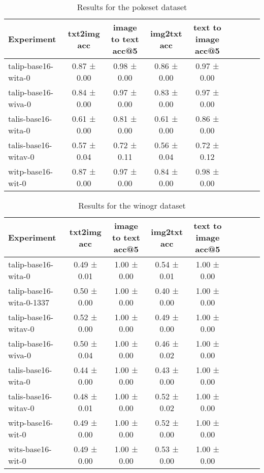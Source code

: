 \begin{table}[htbp]
\caption{Results for the pokeset dataset}
\begin{tabular}{|l|c|c|c|c|c|c|c|c|}\hline
Experiment & txt2img acc & image to text acc@5 & img2txt acc & text to image acc@5\\
\hline
talip-base16-wita-0 & 0.87 ± 0.00 & 0.98 ± 0.00 & 0.86 ± 0.00 & 0.97 ± 0.00\\
\hline
talip-base16-wiva-0 & 0.84 ± 0.00 & 0.97 ± 0.00 & 0.83 ± 0.00 & 0.97 ± 0.00\\
\hline
talis-base16-wita-0 & 0.61 ± 0.00 & 0.81 ± 0.00 & 0.61 ± 0.00 & 0.86 ± 0.00\\
\hline
talis-base16-witav-0 & 0.57 ± 0.04 & 0.72 ± 0.11 & 0.56 ± 0.04 & 0.72 ± 0.12\\
\hline
witp-base16-wit-0 & 0.87 ± 0.00 & 0.97 ± 0.00 & 0.84 ± 0.00 & 0.98 ± 0.00\\
\hline
\end{tabular}
\end{table}

\begin{table}[htbp]
\caption{Results for the winogr dataset}
\begin{tabular}{|l|c|c|c|c|c|c|c|c|}\hline
Experiment & txt2img acc & image to text acc@5 & img2txt acc & text to image acc@5\\
\hline
talip-base16-wita-0 & 0.49 ± 0.01 & 1.00 ± 0.00 & 0.54 ± 0.01 & 1.00 ± 0.00\\
\hline
talip-base16-wita-0-1337 & 0.50 ± 0.00 & 1.00 ± 0.00 & 0.40 ± 0.00 & 1.00 ± 0.00\\
\hline
talip-base16-witav-0 & 0.52 ± 0.00 & 1.00 ± 0.00 & 0.49 ± 0.00 & 1.00 ± 0.00\\
\hline
talip-base16-wiva-0 & 0.50 ± 0.04 & 1.00 ± 0.00 & 0.46 ± 0.02 & 1.00 ± 0.00\\
\hline
talis-base16-wita-0 & 0.44 ± 0.00 & 1.00 ± 0.00 & 0.43 ± 0.00 & 1.00 ± 0.00\\
\hline
talis-base16-witav-0 & 0.48 ± 0.01 & 1.00 ± 0.00 & 0.52 ± 0.02 & 1.00 ± 0.00\\
\hline
witp-base16-wit-0 & 0.49 ± 0.00 & 1.00 ± 0.00 & 0.52 ± 0.00 & 1.00 ± 0.00\\
\hline
wits-base16-wit-0 & 0.49 ± 0.00 & 1.00 ± 0.00 & 0.53 ± 0.00 & 1.00 ± 0.00\\
\hline
\end{tabular}
\end{table}

